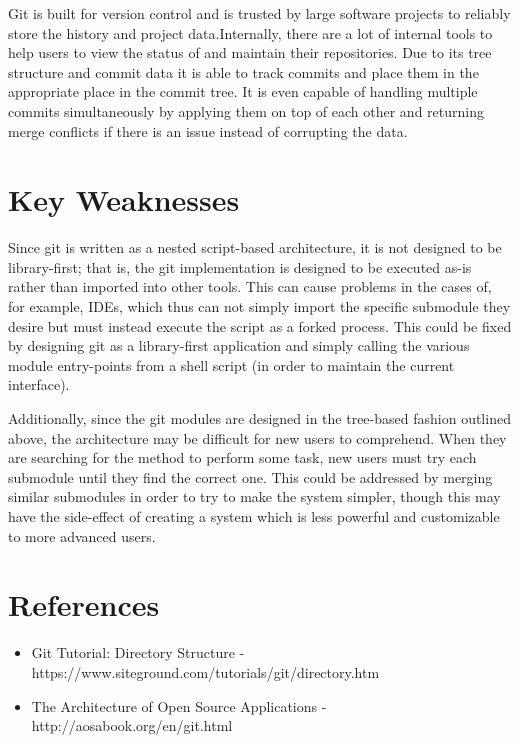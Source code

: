 \documentclass[12pt]{article}
\begin{document}
Git is built for version control and is trusted by large software projects to reliably store the history and project data.Internally, there are a lot of internal tools to help users to view the status of and maintain their repositories. Due to its tree structure and commit data it is able to track commits and place them in the appropriate place in the commit tree. It is even capable of handling multiple commits simultaneously by applying them on top of each other and returning merge conflicts if there is an issue instead of corrupting the data.

\section{Key Weaknesses}
Since git is written as a nested script-based architecture, it is not designed to be library-first; that is, the git implementation is designed to be executed as-is rather than imported into other tools. This can cause problems in the cases of, for example, IDEs, which thus can not simply import the specific submodule they desire but must instead execute the script as a forked process. This could be fixed by designing git as a library-first application and simply calling the various module entry-points from a shell script (in order to maintain the current interface).

Additionally, since the git modules are designed in the tree-based fashion outlined above, the architecture may be difficult for new users to comprehend. When they are searching for the method to perform some task, new users must try each submodule until they find the correct one. This could be addressed by merging similar submodules in order to try to make the system simpler, though this may have the side-effect of creating a system which is less powerful and customizable to more advanced users.

\section{References}
\begin{itemize}
\item Git Tutorial: Directory Structure - https://www.siteground.com/tutorials/git/directory.htm
\item The Architecture of Open Source Applications - http://aosabook.org/en/git.html
\end{itemize}
\end{document}
